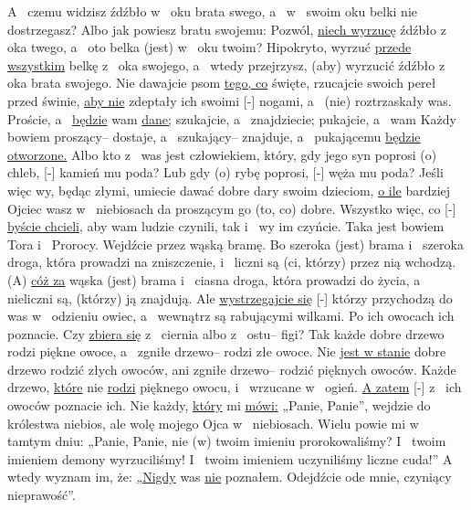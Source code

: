  A~ czemu widzisz źdźbło w~ oku brata swego, a~ w~ swoim oku belki nie dostrzegasz?
 Albo jak powiesz bratu swojemu: Pozwól, \underline{niech wyrzucę} źdźbło z~ oka twego, a~ oto belka (jest) w~ oku twoim?
 Hipokryto, wyrzuć \underline{przede wszystkim} belkę z~ oka swojego, a~ wtedy przejrzysz, (aby) wyrzucić źdźbło z~ oka brata swojego.
 Nie dawajcie psom \underline{tego, co} święte,  rzucajcie swoich pereł przed świnie, \underline{aby nie} zdeptały ich swoimi [-] nogami, a~  (nie) roztrzaskały was.
 Proście, a~ \underline{będzie} wam \underline{dane;} szukajcie, a~ znajdziecie; pukajcie, a~  wam 
 Każdy bowiem proszący– dostaje, a~ szukający– znajduje, a~ pukającemu \underline{będzie otworzone.}
 Albo kto z~ was jest człowiekiem, który, gdy jego syn poprosi (o) chleb, [-] kamień mu poda?
 Lub gdy (o) rybę poprosi, [-] węża mu poda?
 Jeśli więc wy, będąc złymi, umiecie dawać dobre dary swoim dzieciom, \underline{o ile} bardziej Ojciec wasz w~ niebiosach da proszącym go (to, co) dobre.
 Wszystko więc, co [-] \underline{byście chcieli,} aby wam ludzie czynili, tak i~ wy im czyńcie. Taka jest bowiem Tora i~ Prorocy.
 Wejdźcie przez wąską bramę. Bo szeroka (jest) brama i~ szeroka droga, która prowadzi na zniszczenie, i~ liczni są (ci, którzy) przez nią wchodzą.
 (A) \underline{cóż za} wąska (jest) brama i~ ciasna droga, która prowadzi do życia, a~ nieliczni są, (którzy) ją znajdują.
 Ale \underline{wystrzegajcie się} [-]  którzy przychodzą do was w~ odzieniu owiec, a~ wewnątrz są rabującymi wilkami.
 Po ich owocach ich poznacie. Czy \underline{zbiera się} z~ ciernia  albo z~ ostu– figi?
 Tak każde dobre drzewo rodzi piękne owoce, a~ zgniłe drzewo– rodzi złe owoce.
 Nie \underline{jest w stanie} dobre drzewo rodzić złych owoców, ani zgniłe drzewo– rodzić pięknych owoców.
 Każde drzewo, \underline{które} nie \underline{rodzi} pięknego owocu,  i~ wrzucane w~ ogień.
 \underline{A zatem} [-] z~ ich owoców poznacie ich.
 Nie każdy, \underline{który} mi \underline{mówi:} „Panie, Panie”, wejdzie do królestwa niebios, ale  wolę mojego Ojca w~ niebiosach.
 Wielu powie mi w~ tamtym dniu: „Panie, Panie, nie (w) twoim imieniu prorokowaliśmy? I~ twoim imieniem demony wyrzuciliśmy! I~ twoim imieniem uczyniliśmy liczne cuda!”
 A~ wtedy wyznam im, że: \underline{„Nigdy} was \underline{nie} poznałem. Odejdźcie ode mnie, czyniący nieprawość”.
